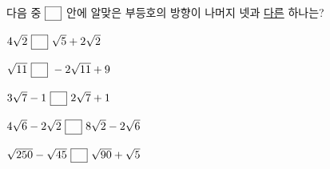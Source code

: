 다음 중 $\blank$ 안에 알맞은 부등호의 방향이 나머지 넷과 \underline{다른} 하나는?
\begin{choicesv}{\rule[-3ex]{0pt}{8ex}$4\sqrt{2}\ \blank\ \sqrt{5}+2\sqrt{2}$}{\rule[-3ex]{0pt}{8ex}$\sqrt{11}\ \blank\ -2\sqrt{11}+9$}{\rule[-3ex]{0pt}{8ex}$3\sqrt{7}-1\ \blank\ 2\sqrt{7}+1$}{\rule[-3ex]{0pt}{8ex}$4\sqrt{6}-2\sqrt{2}\ \blank\ 8\sqrt{2}-2\sqrt{6}$}{\rule[-3ex]{0pt}{8ex}$\sqrt{250}-\sqrt{45}\ \blank\ \sqrt{90}+\sqrt{5}$}\end{choicesv}
